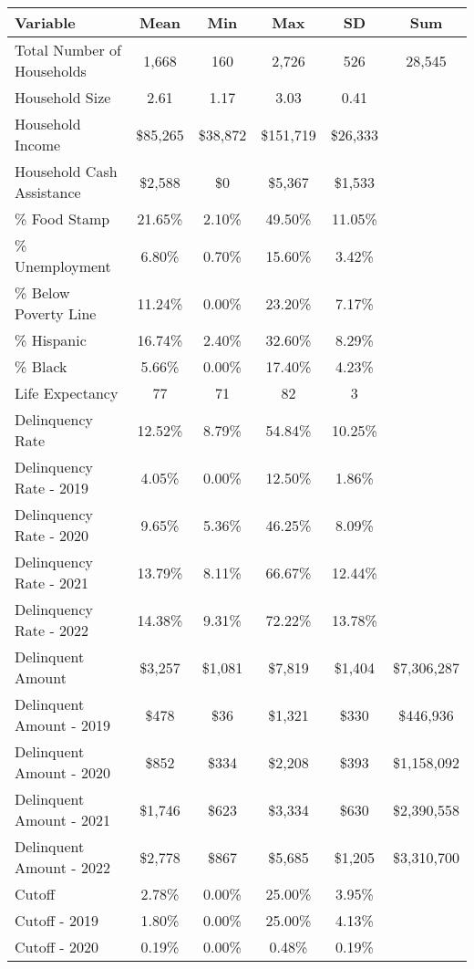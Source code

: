\begin{tabular}{l|c|c|c|c|c}
\toprule 
\midrule 
Variable & Mean & Min & Max & SD & Sum \\
\midrule 
Total Number of Households & 1,668 & 160 & 2,726 & 526 & 28,545 \\
\quad Household Size & 2.61 & 1.17 & 3.03 & 0.41 \\
Household Income & \$85,265 & \$38,872 & \$151,719 & \$26,333 \\
\quad Household Cash Assistance & \$2,588 & \$0 & \$5,367 & \$1,533 \\
\% Food Stamp & 21.65\% & 2.10\% & 49.50\% & 11.05\% \\
\% Unemployment & 6.80\% & 0.70\% & 15.60\% & 3.42\% \\
\% Below Poverty Line & 11.24\% & 0.00\% & 23.20\% & 7.17\% \\
\% Hispanic & 16.74\% & 2.40\% & 32.60\% & 8.29\% \\
\% Black & 5.66\% & 0.00\% & 17.40\% & 4.23\% \\
Life Expectancy & 77 & 71 & 82 & 3 \\
\midrule 
Delinquency Rate & 12.52\% & 8.79\% & 54.84\% & 10.25\% \\
\quad Delinquency Rate - 2019 & 4.05\% & 0.00\% & 12.50\% & 1.86\% \\
\quad Delinquency Rate - 2020 & 9.65\% & 5.36\% & 46.25\% & 8.09\% \\
\quad Delinquency Rate - 2021 & 13.79\% & 8.11\% & 66.67\% & 12.44\% \\
\quad Delinquency Rate - 2022 & 14.38\% & 9.31\% & 72.22\% & 13.78\% \\
\midrule 
Delinquent Amount & \$3,257 & \$1,081 & \$7,819 & \$1,404 & \$7,306,287 \\
\quad Delinquent Amount - 2019 & \$478 & \$36 & \$1,321 & \$330 & \$446,936 \\
\quad Delinquent Amount - 2020 & \$852 & \$334 & \$2,208 & \$393 & \$1,158,092 \\
\quad Delinquent Amount - 2021 & \$1,746 & \$623 & \$3,334 & \$630 & \$2,390,558 \\
\quad Delinquent Amount - 2022 & \$2,778 & \$867 & \$5,685 & \$1,205 & \$3,310,700 \\
\midrule 
Cutoff & 2.78\% & 0.00\% & 25.00\% & 3.95\% \\
\quad Cutoff - 2019 & 1.80\% & 0.00\% & 25.00\% & 4.13\% \\
\quad Cutoff - 2020 & 0.19\% & 0.00\% & 0.48\% & 0.19\% \\

\end{tabular}

